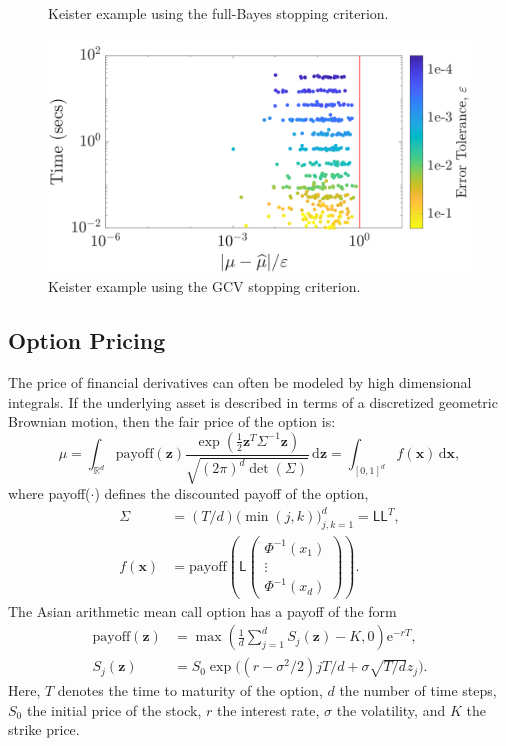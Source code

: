 \documentclass{svjour3}                     %
\newcommand{\bm}[1]{\boldsymbol{#1}}
\newcommand{\mSigma}{\mathsf{\Sigma}}
\newcommand{\dif}[1]{\text{d}{#1}}
\newcommand{\reals}{\mathbb{R}}
\newcommand{\vx}{\bm{x}}
\newcommand{\dvx}{\dif{\bm{x}}}
\newcommand{\vz}{\bm{z}}
\newcommand{\dvz}{\dif{\bm{z}}}
\newcommand{\mL}{\mathsf{L}}
\newcommand{\me}{\mathrm{e}}
\begin{document}
{{{{{{\begin{figure}
\caption[Sobol: Keister guaranteed: Full Bayes]{Keister example using the full-Bayes stopping criterion.}
\label{fig:Sobol-keister-guaranteed-FB}
\end{figure}
\begin{figure}
\centering
\includegraphics[width=0.95\linewidth]{"figures/Sobol/Sobol_Keister_guaranteed_time_GCV__d4_r1_2019-Sep-1"}
\caption[Sobol: Keister guaranteed: GCV]{Keister example using the GCV stopping criterion.}
\label{fig:Sobol-keister-guaranteed-GCV}
\end{figure}







\subsection{Option Pricing}

The price of financial derivatives can often be modeled by high dimensional integrals. If the underlying asset is described in terms of a discretized geometric Brownian motion, then the fair price of the option is:
\begin{equation*}
\mu = \int_{\reals^d} \text{payoff}(\vz) \frac{\exp(\frac 12 \vz^T\mSigma^{-1}\vz)}{\sqrt{(2\pi)^d \det(\mSigma)}} \, \dvz = \int_{[0,1]^d} f(\vx) \, \dvx,
\end{equation*} 
where {payoff($\cdot$)} defines the discounted payoff of the option,
\begin{align*}
\mSigma &= (T/d) \bigl(\min(j,k) \bigr)_{j,k=1}^d = \mL \mL^T,\\
f(\vx) &= \text{payoff} \left(\mL 
\begin{pmatrix}
\Phi^{-1}(x_1) \\ \vdots \\ \Phi^{-1}(x_d)
\end{pmatrix} \right).
\end{align*}
The Asian arithmetic mean call option has a payoff of the form
\begin{align*}
\text{payoff}(\vz) &= \max\left( \frac 1d  \sum_{j=1}^d S_j(\vz) - K, 0 \right) \me^{-r T}, \\
S_j(\vz) &= S_0 \exp\bigl((r-\sigma^2/2)jT/d + \sigma \sqrt{T/d} z_j \bigr).
\end{align*}
Here, $T$ denotes the time to maturity of the option, $d$ the number of time steps, $S_0$ the initial price of the stock, $r$ the interest rate, $\sigma$ the volatility, and $K$ the strike price.  

}}}}}}
\end{document}
